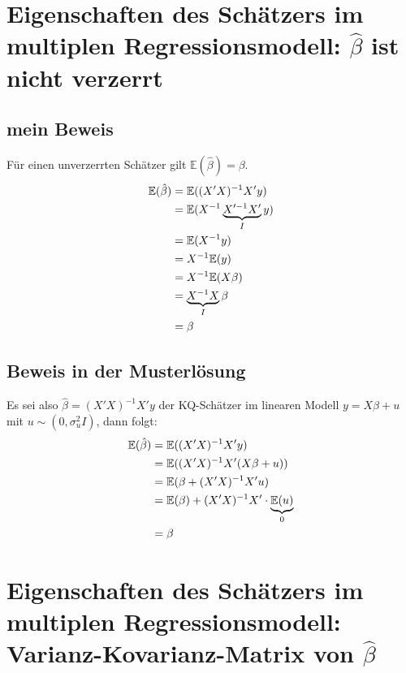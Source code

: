 \documentclass{article}
\newcommand{\E}{\mathbb{E}}
\begin{document}
	\section{Eigenschaften des Schätzers im multiplen Regressionsmodell: $\hat{\beta}$ ist nicht verzerrt}
	\subsection{mein Beweis}
	Für einen unverzerrten Schätzer gilt $\E(\hat{\beta})=\beta$.
	\begin{align}
		\E(\hat{\beta}) &= \E((X'X)^{-1}X'y) \notag \\
		&= \E(X^{-1}\underbrace{X'^{-1}X'}_{I}y) \notag \\
		&= \E(X^{-1}y) \notag \\
		&= X^{-1}\E(y) \notag \\
		&= X^{-1}\E(X\beta) \notag \\
		&= \underbrace{X^{-1}X}_{I}\beta \notag \\
		&= \beta \notag
	\end{align}
	
	\subsection{Beweis in der Musterlösung}
	Es sei also $\hat{\beta}=(X'X)^{-1}X'y$ der KQ-Schätzer im linearen Modell $y=X\beta + u$ mit $u\sim (0,\sigma^2_uI)$, dann folgt:
	\begin{align}
		\E(\hat{\beta}) &= \E((X'X)^{-1}X'y) \notag \\
		&= \E((X'X)^{-1}X'(X\beta + u)) \notag \\
		&= \E(\beta + (X'X)^{-1}X'u) \notag \\
		&= \E(\beta) + (X'X)^{-1}X'\cdot\underbrace{\E(u)}_0 \notag \\
		&= \beta \notag
	\end{align}
	
	\section{Eigenschaften des Schätzers im multiplen Regressionsmodell: Varianz-Kovarianz-Matrix von $\hat{\beta}$}
\end{document}
